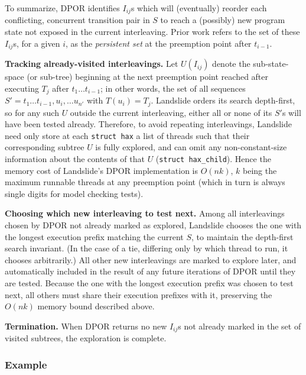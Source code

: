 To summarize, %
DPOR identifies $I_{ij}$s which will (eventually) reorder each conflicting, concurrent transition pair in $S$
to reach a (possibly) new program state not exposed in the current interleaving.
Prior work \cite{partial-order-methods,dpor,optimal-dpor} refers to the set of these $I_{ij}$s,
for a given $i$,
as the {\em persistent set} at the preemption point after $t_{i-1}$.

{\bf Tracking already-visited interleavings.}
Let $U(I_{ij})$ denote the sub-state-space (or sub-tree) beginning at the next preemption point reached
after executing $T_j$ after $t_1 \dots t_{i-1}$;
in other words, the set of all sequences $S' = t_1 \dots t_{i-1}, u_i, \dots u_{n'}$ with $T(u_i) = T_j$.
Landslide orders its search depth-first,
so for any such $U$ outside the current interleaving,
either all or none of its $S'$s will have been tested already.
Therefore, to avoid repeating interleavings,
Landslide need only store at each {\tt struct hax} a list of threads
such that their corresponding subtree $U$ is fully explored,
and can omit any non-constant-size information about the contents of that $U$
({\tt struct hax\_child}).
Hence the memory cost of Landslide's DPOR implementation is $O(nk)$,
$k$ being the maximum runnable threads at any preemption point
(which in turn is always single digits for model checking tests).

{\bf Choosing which new interleaving to test next.}
Among all interleavings chosen by DPOR not already marked as explored,
Landslide chooses the one with the longest execution prefix matching the current $S$,
to maintain the depth-first search invariant.
(In the case of a tie, differing only by which thread to run, it chooses arbitrarily.)
All other new interleavings are marked to explore later, %
and automatically included in the result of any future iterations of DPOR until they are tested.
Because the one with the longest execution prefix was chosen to test next,
all others must share their execution prefixes with it,
preserving the $O(nk)$ memory bound described above.

{\bf Termination.}
When DPOR returns no new $I_{ij}$s not already marked in the set of visited subtrees,
the exploration is complete.

\subsubsection{Example}
\label{sec:landslide-dpor-example}

